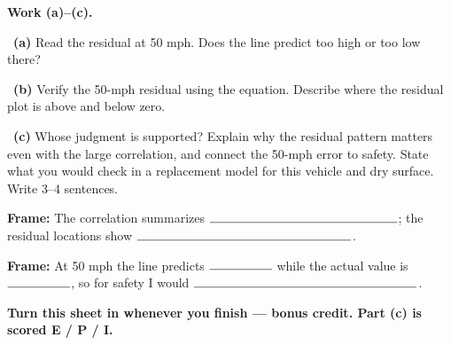 \documentclass[11pt]{article}
\begin{document}
\newpage
\textbf{Work (a)--(c).}\par\smallskip

~\textbf{(a)} Read the residual at 50 mph. Does the line predict too high or too low there?\par
\workspace{0.65in}

~\textbf{(b)} Verify the 50-mph residual using the equation. Describe where the residual plot is above and below zero.\par
\workspace{1.35in}

~\textbf{(c)} Whose judgment is supported? Explain why the residual pattern matters even with the large correlation, and connect the 50-mph error to safety. State what you would check in a replacement model for this vehicle and dry surface. Write 3--4 sentences.\par
\workspace{1.9in}

\begin{sentenceframebox}\raggedright\textbf{Frame:} The correlation summarizes $\blank[2.1in]$; the residual locations show $\blank[2.4in]$.\end{sentenceframebox}

\begin{sentenceframebox}\raggedright\textbf{Frame:} At 50 mph the line predicts $\blank[0.7in]$ while the actual value is $\blank[0.7in]$, so for safety I would $\blank[2.5in]$.\end{sentenceframebox}

\textbf{Turn this sheet in whenever you finish --- bonus credit. Part (c) is scored E / P / I.}\par
\end{document}
